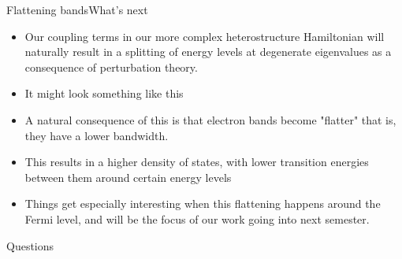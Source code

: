 \documentclass[9pt]{beamer}
\begin{document}
\begin{frame}{Flattening bands}{What's next}
  \begin{itemize}
    \item Our coupling terms in our more complex heterostructure Hamiltonian will naturally result in a splitting of energy levels at degenerate eigenvalues as a consequence of perturbation theory.

    \item It might look something like this

    \item A natural consequence of this is that electron bands become "flatter" that is, they have a lower bandwidth.

    \item This results in a higher density of states, with lower transition energies between them around certain energy levels

    \item Things get especially interesting when this flattening happens around the Fermi level, and will be the focus of our work going into next semester.
  \end{itemize}
\end{frame}

\begin{frame}{Questions}


\end{frame}
\end{document}
